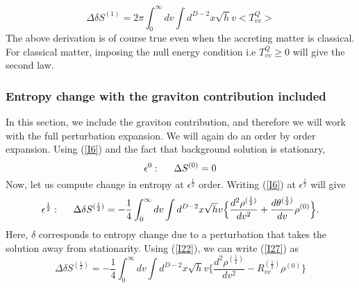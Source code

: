 \documentclass[12pt]{article}
\begin{document}
\begin{equation}\label{EAG8}
\Delta \delta S^{(1)}= 2\pi \int_{0}^{\infty} dv \int  d^{D-2}x \sqrt{h} v <T^{Q}_{vv}>
\end{equation}
The above derivation is of course true even when the accreting matter is classical. For classical matter, imposing the null energy condition i.e $T^{Q}_{vv} \geq 0$ will give the second law.

\subsubsection {Entropy change with the graviton contribution included}
In this section, we include the graviton contribution, and therefore we will work with the full perturbation expansion. We will again do an order by order expansion. Using (\ref{I6}) and the fact that background solution is stationary,
\begin{equation}\label{I26a}
\epsilon^0: \hspace{5mm} \Delta S^{(0)}=0
\end{equation}
 Now, let us compute change in entropy at $\epsilon^{\frac{1}{2}}$ order. Writing (\ref{I6}) at $\epsilon^{\frac{1}{2}}$ will give
\begin{equation}\label{I27}
\epsilon^{\frac{1}{2}}: \hspace{5mm} \Delta \delta S^{(\frac{1}{2})}= -\frac{1}{4}\int_{0}^{\infty} dv \int  d^{D-2}x \sqrt{h} v \Big\{ \frac{d^2 \rho^{(\frac{1}{2})} }{dv^2} + \frac{d\theta^{(\frac{1}{2})}}{dv} \rho^{(0)}  \Big\}.
\end{equation}
Here, $\delta$ corresponds to entropy change due to a perturbation that takes the solution away from stationarity. Using (\ref{I22}), we can write (\ref{I27}) as
\begin{equation}\label{I27a}
\Delta \delta S^{(\frac{1}{2})}= -\frac{1}{4}\int_{0}^{\infty} dv \int  d^{D-2}x \sqrt{h} v \Big\{ \frac{d^2 \rho^{(\frac{1}{2})} }{dv^2} - R_{vv}^{(\frac{1}{2})} \rho^{(0)}  \Big\}
\end{equation}
\end{document}
